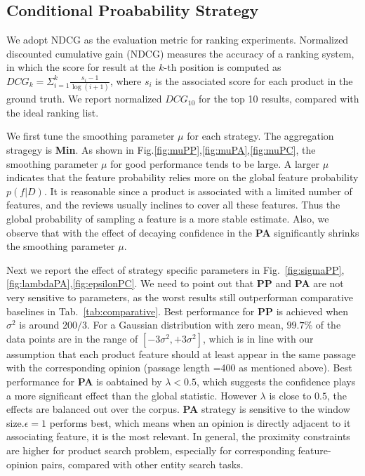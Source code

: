 \documentclass[preprint]{elsarticle}
\begin{document}
\subsection{Conditional Proabability Strategy}
We adopt NDCG as the evaluation metric for ranking experiments. Normalized discounted cumulative gain (NDCG) measures the accuracy of a ranking system, in which the score for result at the $k$-th position is computed as $DCG_k=\Sigma_{i=1}^{k}\frac{s_i-1}{\log (i+1)}$, where $s_i$ is the associated score for each product in the ground truth. We report normalized $DCG_{10}$ for the top 10 results, compared with the ideal ranking list. 

We first tune the smoothing parameter $\mu$ for each strategy. The aggregation stragegy is \textbf{Min}. As shown in Fig.\ref{fig:muPP},\ref{fig:muPA},\ref{fig:muPC}, the smoothing parameter $\mu$ for good performance tends to be large. A larger $\mu$ indicates that the feature probability relies more on the global feature probability $p(f|D)$. It is reasonable since a product is associated with a limited number of features, and the reviews usually inclines to cover all these features. Thus the global probability of sampling a feature is a more stable estimate. Also, we observe that with the effect of decaying confidence in the \textbf{PA} significantly shrinks the smoothing parameter $\mu$.

Next we report the effect of strategy specific parameters in Fig.~\ref{fig:sigmaPP},\ref{fig:lambdaPA},\ref{fig:epsilonPC}. We need to point out that \textbf{PP} and \textbf{PA} are not very sensitive to parameters, as the worst results still outperforman comparative baselines in Tab.~\ref{tab:comparative}. Best performance for \textbf{PP} is achieved when $\sigma^2$ is around $200/3$. For a Gaussian distribution with zero mean, $99.7\%$ of the data points are in the range of $[-3\sigma^2,+3\sigma^2]$, which is in line with our assumption that each product feature should at least appear in the same passage with the corresponding opinion (passage length =400 as mentioned above). Best performance for \textbf{PA} is oabtained by $\lambda<0.5$, which suggests the confidence plays a more significant effect than the global statistic. However $\lambda$ is close to $0.5$, the effects are balanced out over the corpus. \textbf{PA} strategy is sensitive to the window size.$\epsilon=1$ performs best, which means when an opinion is directly adjacent to it associating feature, it is the most relevant. In general, the proximity constraints are higher for product search problem, especially for corresponding feature-opinion pairs, compared with other entity search tasks.  
\end{document}
